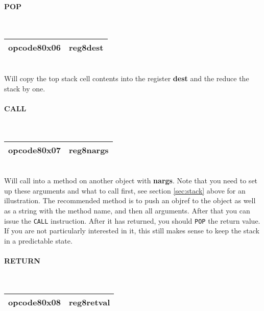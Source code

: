 \documentclass[12pt,a4paper]{article}
\begin{document}
\vspace{2em}\begin{minipage}{\textwidth}
\paragraph{POP}
~\vspace{1em}\\\begin{tabular}{|p{2cm}|p{2cm}|}
\hline
opcode8\newline\textbf{0x06} & reg8\newline\textbf{dest} \\
\hline
\end{tabular}\vspace{1em}\\
Will copy the top stack cell contents into the register \textbf{dest} and the reduce the stack by one.
\end{minipage}

\vspace{2em}\begin{minipage}{\textwidth}
\paragraph{CALL}
~\vspace{1em}\\\begin{tabular}{|p{2cm}|p{2cm}|}
\hline
opcode8\newline\textbf{0x07} & reg8\newline\textbf{nargs} \\
\hline
\end{tabular}\vspace{1em}\\
Will call into a method on another object with \textbf{nargs}. Note that you need to set up these arguments and what to call first, see section \ref{sec:stack} above for an illustration. The recommended method is to push an objref  to the object as well as a string with the method name, and then all arguments. After that you can issue the \verb|CALL| instruction. After it has  returned, you should \verb|POP| the return value. If you are not particularly interested in it, this still makes sense to keep the stack in a predictable state.
\end{minipage}

\vspace{2em}\begin{minipage}{\textwidth}
\paragraph{RETURN}
~\vspace{1em}\\\begin{tabular}{|p{2cm}|p{2cm}|}
\hline
opcode8\newline\textbf{0x08} & reg8\newline\textbf{retval} \\
\hline
\end{tabular}\vspace{1em}\\
\end{minipage}
\end{document}
